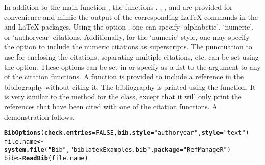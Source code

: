 \documentclass[article]{jss}\usepackage[]{graphicx}\usepackage[]{color}
\makeatletter
\newcommand{\hlnum}[1]{\textcolor[rgb]{0.125,0.125,1}{#1}}%
\newcommand{\hlstr}[1]{\textcolor[rgb]{0.125,0.125,1}{#1}}%
\newcommand{\hlstd}[1]{\textcolor[rgb]{0.251,0.251,0.282}{#1}}%
\newcommand{\hlkwb}[1]{\textcolor[rgb]{0.439,0.251,1}{\textbf{#1}}}%
\newcommand{\hlkwc}[1]{\textcolor[rgb]{0.529,0,0.184}{\textbf{#1}}}%
\newcommand{\hlkwd}[1]{\textcolor[rgb]{0.251,0.251,0.282}{\textbf{#1}}}%
\newenvironment{kframe}{%
 \def\at@end@of@kframe{}%
 \ifinner\ifhmode%
  \def\at@end@of@kframe{\end{minipage}}%
  \begin{minipage}{\columnwidth}%
 \fi\fi%
 \def\FrameCommand##1{\hskip\@totalleftmargin \hskip-\fboxsep
 \colorbox{shadecolor}{##1}\hskip-\fboxsep
     \hskip-\linewidth \hskip-\@totalleftmargin \hskip\columnwidth}%
 \MakeFramed {\advance\hsize-\width
   \@totalleftmargin\z@ \linewidth\hsize
   \@setminipage}}%
 {\par\unskip\endMakeFramed%
 \at@end@of@kframe}
\newenvironment{knitrout}{}{} %
\makeatother
\begin{document}
In addition to the main function , the functions , , , and  are provided for convenience and mimic the output of the corresponding \LaTeX{} commands in the  and  \LaTeX{} packages.  Using the option , one can specify `alphabetic', `numeric', or `authoryear'  citations.  Additionally, for the `numeric' style, one may specify the option  to include the numeric citations as superscripts.  The punctuation to use for enclosing the citations, separating multiple citations, etc. can be set using the  option.  These options can be set in  or specify as a list to the  argument to any of the citation functions.  A function  is provided to include a reference in the bibliography without citing it.  The bibliography is printed using the  function.  It is very similar to the  method for the  class, except that it will only print the references that have been cited with one of the citation functions.  A demonstration follows.  
\begin{knitrout}
\color{fgcolor}\begin{kframe}
\begin{alltt}
\hlkwd{BibOptions}\hlstd{(}\hlkwc{check.entries} \hlstd{=} \hlnum{FALSE}\hlstd{,} \hlkwc{bib.style} \hlstd{=} \hlstr{"authoryear"}\hlstd{,} \hlkwc{style} \hlstd{=} \hlstr{"text"}\hlstd{)}
\hlstd{file.name} \hlkwb{<-} \hlkwd{system.file}\hlstd{(}\hlstr{"Bib"}\hlstd{,} \hlstr{"biblatexExamples.bib"}\hlstd{,} \hlkwc{package} \hlstd{=} \hlstr{"RefManageR"}\hlstd{)}
\hlstd{bib} \hlkwb{<-} \hlkwd{ReadBib}\hlstd{(file.name)}
\end{alltt}
\end{kframe}
\end{knitrout}
\end{document}
